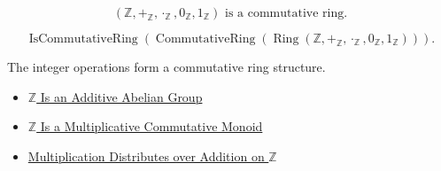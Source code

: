 \begin{remark*}
\[
(\mathbb{Z},+_{\mathbb{Z}},\cdot_{\mathbb{Z}},0_{\mathbb{Z}},1_{\mathbb{Z}})
\text{ is a commutative ring.}
\]
\end{remark*}

\begin{remark*}
\[
\operatorname{IsCommutativeRing}(
\operatorname{CommutativeRing}(
\operatorname{Ring}(\mathbb{Z},+_{\mathbb{Z}},\cdot_{\mathbb{Z}},
0_{\mathbb{Z}},1_{\mathbb{Z}}))).
\]
\end{remark*}

\begin{remark*}[Interpretation]
The integer operations form a commutative ring structure.
\end{remark*}

\begin{dependencies}
\begin{itemize}
\item \hyperref[thm:z-additive-abelian-group]{$\mathbb{Z}$ Is an Additive Abelian Group}
  \item \hyperref[thm:z-multiplicative-commutative-monoid]{$\mathbb{Z}$ Is a Multiplicative Commutative Monoid}
  \item \hyperref[thm:multiplication-distributes-over-addition-on-z]{Multiplication Distributes over Addition on $\mathbb{Z}$}
\end{itemize}
\end{dependencies}
